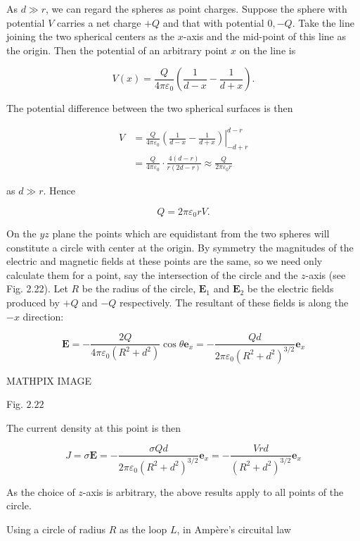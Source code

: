 \documentclass[10pt]{article}
\begin{document}
 As $d \gg r$, we can regard the spheres as point charges. Suppose the sphere with potential $V$ carries a net charge $+Q$ and that with potential $0,-Q$. Take the line joining the two spherical centers as the $x$-axis and the mid-point of this line as the origin. Then the potential of an arbitrary point $x$ on the line is

$$
V(x)=\frac{Q}{4 \pi \varepsilon_{0}}\left(\frac{1}{d-x}-\frac{1}{d+x}\right) .
$$

The potential difference between the two spherical surfaces is then

$$
\begin{aligned}
V &=\left.\frac{Q}{4 \pi \varepsilon_{0}}\left(\frac{1}{d-x}-\frac{1}{d+x}\right)\right|_{-d+r} ^{d-r} \\
&=\frac{Q}{4 \pi \varepsilon_{0}} \cdot \frac{4(d-r)}{r(2 d-r)} \approx \frac{Q}{2 \pi \varepsilon_{0} r}
\end{aligned}
$$

as $d \gg r$. Hence

$$
Q=2 \pi \varepsilon_{0} r V .
$$

On the $y z$ plane the points which are equidistant from the two spheres will constitute a circle with center at the origin. By symmetry the magnitudes of the electric and magnetic fields at these points are the same, so we need only calculate them for a point, say the intersection of the circle and the $z$-axis (see Fig. 2.22). Let $R$ be the radius of the circle, $\mathbf{E}_{1}$ and $\mathbf{E}_{2}$ be the electric fields produced by $+Q$ and $-Q$ respectively. The resultant of these fields is along the $-x$ direction:

$$
\mathbf{E}=-\frac{2 Q}{4 \pi \varepsilon_{0}\left(R^{2}+d^{2}\right)} \cos \theta \mathbf{e}_{x}=-\frac{Q d}{2 \pi \varepsilon_{0}\left(R^{2}+d^{2}\right)^{3 / 2}} \mathbf{e}_{x}
$$



MATHPIX IMAGE

Fig. $2.22$

The current density at this point is then

$$
J=\sigma \mathbf{E}=-\frac{\sigma Q d}{2 \pi \varepsilon_{0}\left(R^{2}+d^{2}\right)^{3 / 2}} \mathbf{e}_{x}=-\frac{V r d}{\left(R^{2}+d^{2}\right)^{3 / 2}} \mathbf{e}_{x}
$$

As the choice of $z$-axis is arbitrary, the above results apply to all points of the circle.

 Using a circle of radius $R$ as the loop $L$, in Ampère's circuital law
\end{document}
